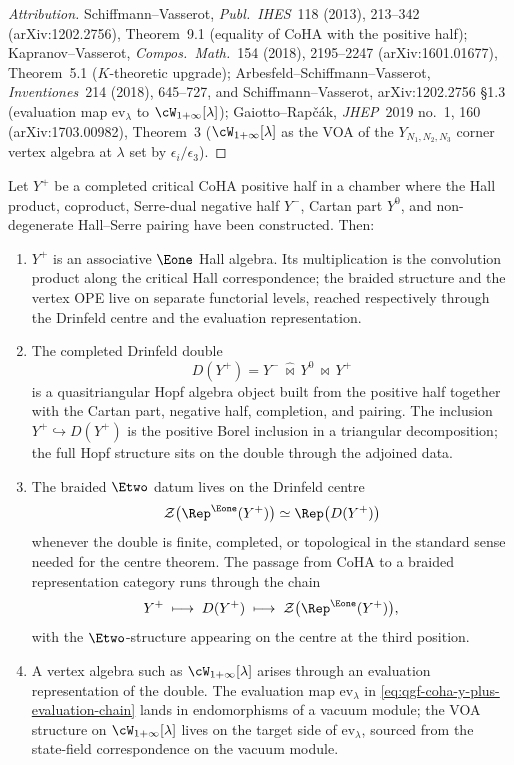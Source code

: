 \begin{proof}[Attribution]
Schiffmann--Vasserot, \emph{Publ.\ IHES}\ 118 (2013), 213--342 (arXiv:1202.2756), Theorem~9.1 (equality of CoHA with the positive half); Kapranov--Vasserot, \emph{Compos.\ Math.}\ 154 (2018), 2195--2247 (arXiv:1601.01677), Theorem~5.1 ($K$-theoretic upgrade); Arbesfeld--Schiffmann--Vasserot, \emph{Inventiones}\ 214 (2018), 645--727, and Schiffmann--Vasserot, arXiv:1202.2756 \S 1.3 (evaluation map $\mathrm{ev}_\lambda$ to $\cW_{1+\infty}[\lambda]$); Gaiotto--Rap\v{c}\'ak, \emph{JHEP}\ 2019 no.\ 1, 160 (arXiv:1703.00982), Theorem~3 ($\cW_{1+\infty}[\lambda]$ as the VOA of the $Y_{N_1,N_2,N_3}$ corner vertex algebra at $\lambda$ set by $\epsilon_i/\epsilon_3$).
\end{proof}

\begin{lemma}
\label{lem:qgf-coha-double-centre-operadic-level}
Let $Y^+$ be a completed critical CoHA positive half in a chamber where
the Hall product, coproduct, Serre-dual negative half $Y^-$, Cartan
part $Y^0$, and non-degenerate Hall--Serre pairing have been
constructed. Then:
\begin{enumerate}[label=\textup{(\roman*)}]
\item $Y^+$ is an associative $\Eone$ Hall algebra. Its multiplication
is the convolution product along the critical Hall correspondence; the
braided structure and the vertex OPE live on separate functorial
levels, reached respectively through the Drinfeld centre and the
evaluation representation.
\item The completed Drinfeld double
\[
 D(Y^+) = Y^-\, \widehat{\bowtie}\, Y^0\, \widehat{\bowtie}\, Y^+
\]
is a quasitriangular Hopf algebra object built from the positive half
together with the Cartan part, negative half, completion, and pairing.
The inclusion $Y^+ \hookrightarrow D(Y^+)$ is the positive Borel
inclusion in a triangular decomposition; the full Hopf structure
sits on the double through the adjoined data.
\item The braided $\Etwo$ datum lives on the Drinfeld centre
\[
 \mathcal Z\bigl(\Rep^{\Eone}(Y^+)\bigr)
 \simeq
 \Rep\bigl(D(Y^+)\bigr)
\]
whenever the double is finite, completed, or topological in the
standard sense needed for the centre theorem. The passage from CoHA
to a braided representation category runs through the chain
\[
 Y^+ \;\longmapsto\; D(Y^+) \;\longmapsto\; \mathcal Z\bigl(\Rep^{\Eone}(Y^+)\bigr),
\]
with the $\Etwo$-structure appearing on the centre at the third
position.
\item A vertex algebra such as $\cW_{1+\infty}[\lambda]$ arises
through an evaluation representation of the double. The evaluation
map $\mathrm{ev}_\lambda$ in
\eqref{eq:qgf-coha-y-plus-evaluation-chain} lands in endomorphisms of
a vacuum module; the VOA structure on $\cW_{1+\infty}[\lambda]$ lives
on the target side of $\mathrm{ev}_\lambda$, sourced from the
state-field correspondence on the vacuum module.
\end{enumerate}
\end{lemma}

